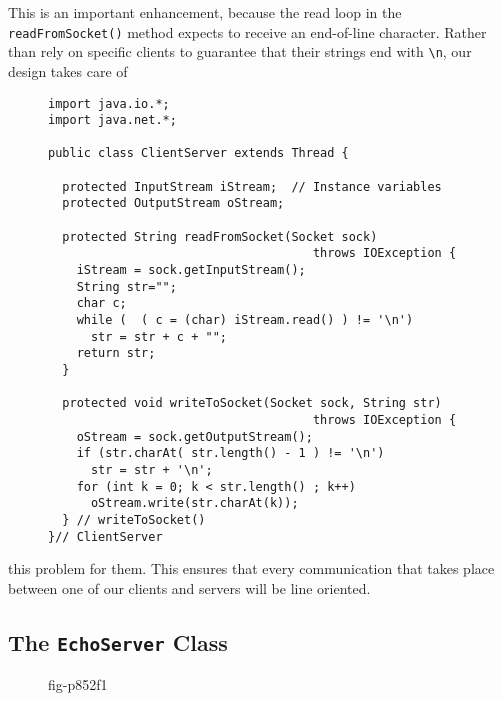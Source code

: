 This is an important enhancement, because the read loop in the
{\tt read\-From\-Socket()} method expects to receive an end-of-line
character.  Rather than rely on specific clients to
guarantee that their strings end with \verb|\n|, our design takes care of
\begin{figure}[h]
\jjjprogstart
\begin{jjjlisting}
\begin{lstlisting}
import java.io.*;
import java.net.*;

public class ClientServer extends Thread {

  protected InputStream iStream;  // Instance variables
  protected OutputStream oStream;

  protected String readFromSocket(Socket sock) 
                                     throws IOException {
    iStream = sock.getInputStream();
    String str="";
    char c;
    while (  ( c = (char) iStream.read() ) != '\n')
      str = str + c + "";
    return str;
  }

  protected void writeToSocket(Socket sock, String str) 
                                     throws IOException {
    oStream = sock.getOutputStream();
    if (str.charAt( str.length() - 1 ) != '\n')
      str = str + '\n';
    for (int k = 0; k < str.length() ; k++)
      oStream.write(str.charAt(k));
  } // writeToSocket()
}// ClientServer
\end{lstlisting}
\end{jjjlisting}
\end{figure}
this problem for them.   This ensures that every communication that
takes place between one of our clients and servers will be
line oriented.


\subsection{The {\tt EchoServer} Class}

\begin{figure}[ht]
 {fig-p852f1}
\end{figure}


